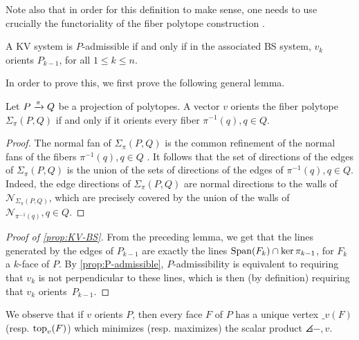
Note also that in order for this definition to make sense, one needs to use crucially the functoriality of the fiber polytope construction \cite[Lemma 2.3]{BilleraSturmfels92}.

\begin{proposition}
\label{prop:KV-BS}
    A KV system is $P$-admissible if and only if in the associated BS system, $v_k$ orients $P_{k-1}$, for all $1\leq k \leq n$.
\end{proposition}

In order to prove this, we first prove the following general lemma.

\begin{lemma} \label{lemma:orients-the-fibers}
    Let $P \xrightarrow{\pi} Q$ be a projection of polytopes. 
    A vector $v$ orients the fiber polytope $\Sigma_\pi(P,Q)$ if and only if it orients every fiber $\pi^{-1}(q), q \in Q$. 
\end{lemma}

\begin{proof}
    The normal fan of $\Sigma_\pi(P,Q)$ is the common refinement of the normal fans of the fibers $\pi^{-1}(q), q \in Q$ \cite[Proposition 2.2]{BilleraSturmfels94}.
    It follows that the set of directions of the edges of $\Sigma_\pi(P,Q)$ is the union of the sets of directions of the edges of $\pi^{-1}(q), q \in Q$. 
    Indeed, the edge directions of $\Sigma_\pi(P,Q)$ are normal directions to the walls of $\mathcal{N}_{\Sigma_\pi(P,Q)}$, which are precisely covered by the union of the walls of $\mathcal{N}_{\pi^{-1}(q)}, q \in Q$. 
\end{proof}

\begin{proof}[Proof of \cref{prop:KV-BS}]
    From the preceding lemma, we get that the lines generated by the edges of $P_{k-1}$ are exactly the lines $\operatorname{\mathrm{Span}}(F_k)\cap \ker \pi_{k-1}$, for $F_k$ a $k$-face of $P$. 
    By \cref{prop:P-admissible}, $P$-admissibility is equivalent to requiring that $v_k$ is not perpendicular to these lines, which is then (by definition) requiring that $v_k$ orients~$P_{k-1}$. 
\end{proof}

We observe that if $v$ orients $P$, then every face $F$ of $P$ has a unique vertex $\bm_v(F)$ (resp. $\operatorname{top}_v(F)$) which minimizes (resp. maximizes) the scalar product $\angles{-,v}$.

